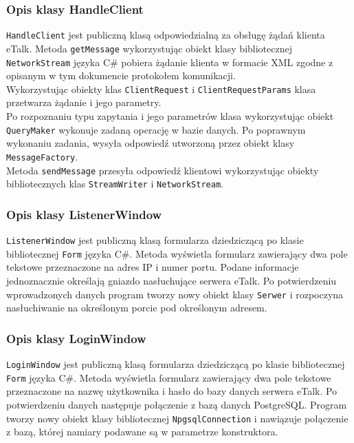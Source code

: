 \documentclass[a4paper,12pt]{article}
\begin{document}
\subsubsection[Opis klasy HandleClient]{Opis klasy HandleClient}
\texttt{HandleClient} jest publiczną klasą odpowiedzialną za obsługę żądań klienta eTalk. Metoda \texttt{getMessage}
wykorzystując obiekt klasy bibliotecznej \texttt{NetworkStream} języka C\# pobiera żądanie klienta w formacie XML zgodne z opisanym w tym dokumencie protokołem komunikacji.\\
Wykorzystując obiekty klas \texttt{ClientRequest} i \texttt{ClientRequestParams} klasa przetwarza żądanie i jego parametry. \\
Po rozpoznaniu typu zapytania i jego parametrów klasa wykorzystując obiekt \texttt{QueryMaker} wykonuje zadaną operację w bazie danych. Po poprawnym wykonaniu zadania, wysyła odpowiedź utworzoną przez obiekt klasy \texttt{MessageFactory}.\\
Metoda \texttt{sendMessage} przesyła odpowiedź klientowi wykorzystując obiekty bibliotecznych klas \texttt{StreamWriter} i \texttt{NetworkStream}.\\

\subsubsection[Opis klasy ListenerWindow]{Opis klasy ListenerWindow}
\texttt{ListenerWindow} jest publiczną klasą formularza dziedziczącą po klasie bibliotecznej \texttt{Form}
języka C\#. Metoda wyświetla formularz zawierający dwa pole tekstowe przeznaczone na adres IP i numer portu.
Podane informacje jednoznacznie określają gniazdo nasłuchujące serwera eTalk. Po potwierdzeniu wprowadzonych danych
program tworzy nowy obiekt klasy \texttt{Serwer} i rozpoczyna nasłuchiwanie na określonym porcie pod określonym adresem.

\subsubsection[Opis klasy LoginWindow]{Opis klasy LoginWindow}
\texttt{LoginWindow} jest publiczną klasą formularza dziedziczącą po klasie bibliotecznej \texttt{Form}
języka C\#. Metoda wyświetla formularz zawierający dwa pole tekstowe przeznaczone na nazwę użytkownika i hasło do bazy danych serwera eTalk. Po potwierdzeniu danych następuje połączenie z bazą danych PostgreSQL.
Program tworzy nowy obiekt klasy bibliotecznej \texttt{NpgsqlConnection} i nawiązuje połączenie z bazą, której namiary podawane są w parametrze konstruktora.
\end{document}
